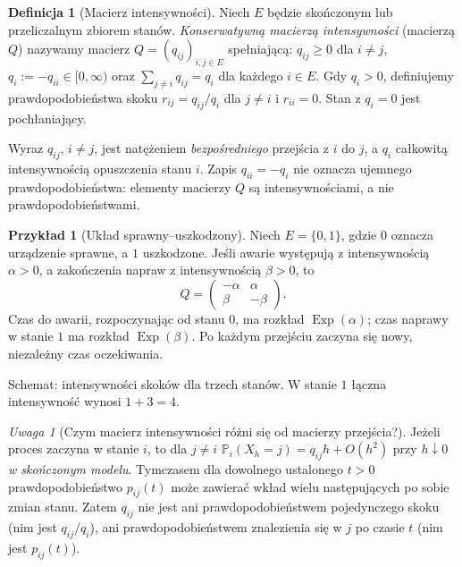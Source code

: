 \documentclass[11pt,a4paper,oneside]{report}
\numberwithin{equation}{chapter}
\theoremstyle{plain}
\theoremstyle{definition}
\newtheorem{definicja}{Definicja}[chapter]
\newtheorem{przyklad}{Przykład}[chapter]
\theoremstyle{remark}
\newtheorem{uwaga}{Uwaga}[chapter]
\newcommand{\Prob}{\mathbb{P}}
\begin{document}
\begin{definicja}[Macierz intensywności]
Niech $E$ będzie skończonym lub przeliczalnym zbiorem stanów.
\emph{Konserwatywną macierzą intensywności} (macierzą $Q$)
nazywamy macierz $Q=(q_{ij})_{i,j\in E}$ spełniającą:
$q_{ij}\ge0$ dla $i\ne j$, $q_i:=-q_{ii}\in[0,\infty)$
oraz $\sum_{j\ne i}q_{ij}=q_i$ dla każdego $i\in E$.
Gdy $q_i>0$, definiujemy prawdopodobieństwa skoku
$r_{ij}=q_{ij}/q_i$ dla $j\ne i$ i $r_{ii}=0$.
Stan z $q_i=0$ jest pochłaniający.
\end{definicja}

Wyraz $q_{ij}$, $i\ne j$, jest natężeniem \emph{bezpośredniego}
przejścia z $i$ do $j$, a $q_i$ całkowitą intensywnością
opuszczenia stanu $i$. Zapis $q_{ii}=-q_i$ nie oznacza
ujemnego prawdopodobieństwa: elementy macierzy $Q$ są
intensywnościami, a nie prawdopodobieństwami.

\begin{przyklad}[Układ sprawny--uszkodzony]
Niech $E=\{0,1\}$, gdzie $0$ oznacza urządzenie sprawne,
a $1$ uszkodzone. Jeśli awarie występują z intensywnością
$\alpha>0$, a zakończenia napraw z intensywnością $\beta>0$,
to
\[
Q=\begin{pmatrix}-\alpha&\alpha\\\beta&-\beta\end{pmatrix}.
\]
Czas do awarii, rozpoczynając od stanu $0$, ma rozkład
$\operatorname{Exp}(\alpha)$; czas naprawy w stanie $1$
ma rozkład $\operatorname{Exp}(\beta)$. Po każdym przejściu
zaczyna się nowy, niezależny czas oczekiwania.
\end{przyklad}

\begin{center}
\par\smallskip\small Schemat: intensywności skoków dla trzech stanów.
W stanie $1$ łączna intensywność wynosi $1+3=4$.
\end{center}


\begin{uwaga}[Czym macierz intensywności różni się od macierzy przejścia?]
Jeżeli proces zaczyna w stanie $i$, to dla $j\ne i$
$\Prob_i(X_h=j)=q_{ij}h+O(h^2)$ przy $h\downarrow0$
\emph{w skończonym modelu}. Tymczasem dla dowolnego
ustalonego $t>0$ prawdopodobieństwo $p_{ij}(t)$ może zawierać
wkład wielu następujących po sobie zmian stanu.
Zatem $q_{ij}$ nie jest ani prawdopodobieństwem pojedynczego
skoku (nim jest $q_{ij}/q_i$), ani prawdopodobieństwem
znalezienia się w $j$ po czasie $t$ (nim jest $p_{ij}(t)$).
\end{uwaga}
\end{document}
